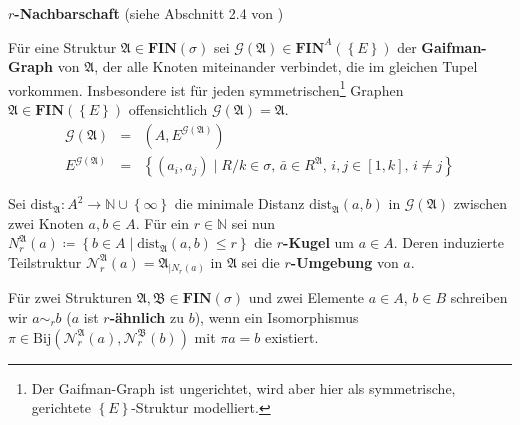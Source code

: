 \begin{defn}
\textbf{\label{def:neighborhoods}$r$-Nachbarschaft} (siehe Abschnitt
2.4 von \cite{EbbinghausFlum})

Für eine Struktur $\mathfrak{A}\in\mathbf{FIN}\left(\sigma\right)$
sei $\mathcal{G}\left(\mathfrak{A}\right)\in\mathbf{FIN}^{A}\left(\left\{ E\right\} \right)$
der \textbf{Gaifman-Graph} von $\mathfrak{A}$, der alle Knoten miteinander
verbindet, die im gleichen Tupel vorkommen. Insbesondere ist für jeden
symmetrischen\footnote{Der Gaifman-Graph ist ungerichtet, wird aber hier als symmetrische,
gerichtete $\left\{ E\right\} $-Struktur modelliert.} Graphen $\mathfrak{A}\in\mathbf{FIN}\left(\left\{ E\right\} \right)$
offensichtlich $\mathcal{G}\left(\mathfrak{A}\right)=\mathfrak{A}$.
\begin{eqnarray*}
\mathcal{G}\left(\mathfrak{A}\right) & = & \left(A,E^{\mathcal{G}\left(\mathfrak{A}\right)}\right)\\
E^{\mathcal{G}\left(\mathfrak{A}\right)} & = & \left\{ \left(a_{i},a_{j}\right)\mid R/k\in\sigma,\,\bar{a}\in R^{\mathfrak{A}},\,i,j\in\left[1,k\right],\,i\neq j\right\} 
\end{eqnarray*}

Sei $\mathrm{dist}_{\mathfrak{A}}:A^{2}\rightarrow\mathbb{N\cup\left\{ \infty\right\} }$
die minimale Distanz $\mathrm{dist}_{\mathfrak{A}}\left(a,b\right)$
in $\mathcal{G}\left(\mathfrak{A}\right)$ zwischen zwei Knoten $a,b\in A$.
Für ein $r\in\mathbb{N}$ sei nun $N_{r}^{\mathfrak{A}}\left(a\right)\coloneqq\left\{ b\in A\mid\mathrm{dist}_{\mathfrak{A}}\left(a,b\right)\leqslant r\right\} $
die \textbf{$r$-Kugel} um $a\in A$. Deren induzierte Teilstruktur
$\mathcal{N}_{r}^{\mathfrak{A}}\left(a\right)=\mathfrak{A}_{\mid N_{r}\left(a\right)}$
in $\mathfrak{A}$ sei die \textbf{$r$-Umgebung} von $a$.

Für zwei Strukturen $\mathfrak{A},\mathfrak{B}\in\mathbf{FIN}\left(\sigma\right)$
und zwei Elemente $a\in A$, $b\in B$ schreiben wir $a\sim_{r}b$
($a$ ist \textbf{$r$-ähnlich} zu $b$), wenn ein Isomorphismus $\pi\in\mathrm{Bij}\left(\mathcal{N}_{r}^{\mathfrak{A}}\left(a\right),\mathcal{N}_{r}^{\mathfrak{B}}\left(b\right)\right)$
mit $\pi a=b$ existiert.
\end{defn}

